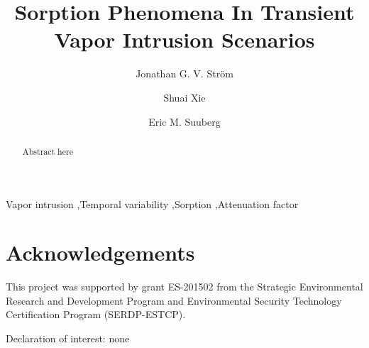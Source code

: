 \documentclass[preprint,12pt]{elsarticle}
\begin{document}
\begin{frontmatter}
\title{Sorption Phenomena In Transient Vapor Intrusion Scenarios}

\author[Brown]{Jonathan G. V. Ström}
\author[Brown]{Shuai Xie}
\author[Brown]{Eric M. Suuberg}


\address{These authors contributed equally to this work}
\address[Brown]{Brown University, School of Engineering, Providence, RI, USA}

\begin{abstract}
Abstract here
\end{abstract}

\begin{keyword}
  Vapor intrusion \sep Temporal variability \sep Sorption \sep Attenuation factor
\end{keyword}

\end{frontmatter}







\section*{Acknowledgements}
This project was supported by grant ES-201502 from the Strategic Environmental Research and Development Program and Environmental Security Technology Certification Program (SERDP-ESTCP).\par

Declaration of interest: none




\end{document}
